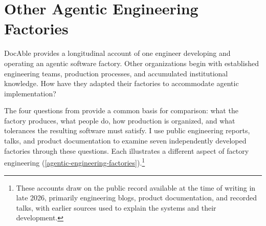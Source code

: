 


\chapter{Other Agentic Engineering Factories}


DocAble provides a longitudinal account of one engineer developing and operating an agentic software factory. Other organizations begin with established engineering teams, production processes, and accumulated institutional knowledge. How have they adapted their factories to accommodate agentic implementation?


The four questions from  provide a common basis for comparison: what the factory produces, what people do, how production is organized, and what tolerances the resulting software must satisfy. I use public engineering reports, talks, and product documentation to examine seven independently developed factories through these questions. Each illustrates a different aspect of factory engineering (\autoref{agentic-engineering-factories}).\footnote{These accounts draw on the public record available at the time of writing in late 2026, primarily engineering blogs, product documentation, and recorded talks, with earlier sources used to explain the systems and their development.}

